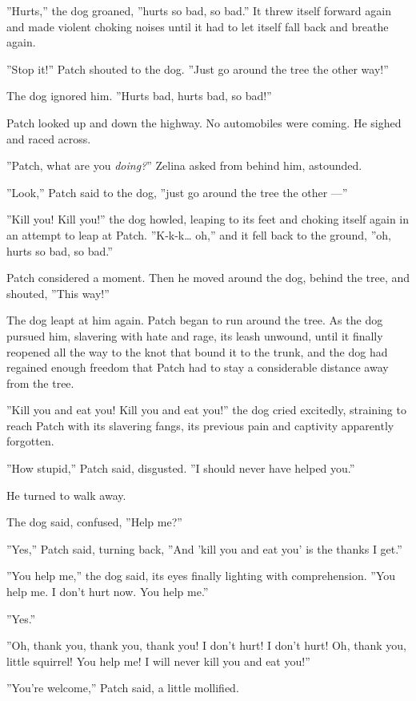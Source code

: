 \documentclass[12pt]{book}
\begin{document}
''Hurts,'' the dog groaned, ''hurts so bad, so bad.'' It threw itself
forward again and made violent choking noises until it had to let
itself fall back and breathe again.

''Stop it!'' Patch shouted to the dog. ''Just go around the tree the
other way!''

The dog ignored him. ''Hurts bad, hurts bad, so bad!''

Patch looked up and down the highway. No automobiles were coming. He
sighed and raced across.

''Patch, what are you \textit{doing?}'' Zelina asked from behind him,
astounded.

''Look,'' Patch said to the dog, ''just go around the tree the other
---''

''Kill you! Kill you!'' the dog howled, leaping to its feet and
choking itself again in an attempt to leap at Patch. ''K-k-k\ldots{}
oh,'' and it fell back to the ground, ''oh, hurts so bad, so bad.''

Patch considered a moment. Then he moved around the dog, behind the
tree, and shouted, ''This way!''

The dog leapt at him again. Patch began to run around the tree. As the
dog pursued him, slavering with hate and rage, its leash unwound,
until it finally reopened all the way to the knot that bound it to the
trunk, and the dog had regained enough freedom that Patch had to stay
a considerable distance away from the tree.

''Kill you and eat you! Kill you and eat you!'' the dog cried
excitedly, straining to reach Patch with its slavering fangs, its
previous pain and captivity apparently forgotten.

''How stupid,'' Patch said, disgusted. ''I should never have helped
you.''

He turned to walk away.

The dog said, confused, ''Help me?''

''Yes,'' Patch said, turning back, ''And 'kill you and eat you' is the
thanks I get.''

''You help me,'' the dog said, its eyes finally lighting with
comprehension. ''You help me. I don't hurt now. You help me.''

''Yes.''

''Oh, thank you, thank you, thank you! I don't hurt! I don't hurt! Oh,
thank you, little squirrel! You help me! I will never kill you and eat
you!''

''You're welcome,'' Patch said, a little mollified.
\end{document}
